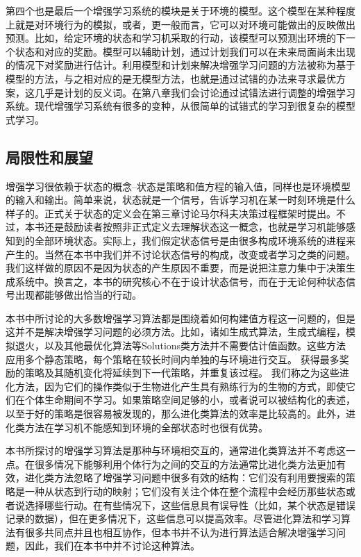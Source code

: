 \documentclass{ctexart}
\begin{document}
            第四个也是最后一个增强学习系统的模块是关于环境的模型。这个模型在某种程度上就是对环境行为的模拟，或者，更一般而言，它可以对环境可能做出的反映做出预测。比如，给定环境的状态和学习机采取的行动，该模型可以预测出环境的下一个状态和对应的奖励。模型可以辅助计划，通过计划我们可以在未来局面尚未出现的情况下对奖励进行估计。利用模型和计划来解决增强学习问题的方法被称为基于模型的方法，与之相对应的是无模型方法，也就是通过试错的办法来寻求最优方案，这几乎是计划的反义词。在第八章我们会讨论通过试错法进行调整的增强学习系统。现代增强学习系统有很多的变种，从很简单的试错式的学习到很复杂的模型式学习。

        \subsection{局限性和展望}
            增强学习很依赖于状态的概念--状态是策略和值方程的输入值，同样也是环境模型的输入和输出。简单来说，状态就是一个信号，告诉学习机在某一时刻环境是什么样子的。正式关于状态的定义会在第三章讨论马尔科夫决策过程框架时提出。不过，本书还是鼓励读者按照非正式定义去理解状态这一概念，也就是学习机能够感知到的全部环境状态。实际上，我们假定状态信号是由很多构成环境系统的进程来产生的。当然在本书中我们并不讨论状态信号的构成，改变或者学习之类的问题。我们这样做的原因不是因为状态的产生原因不重要，而是说把注意力集中于决策生成系统中。换言之，本书的研究核心不在于设计状态信号，而在于无论何种状态信号出现都能够做出恰当的行动。

            本书中所讨论的大多数增强学习算法都是围绕着如何构建值方程这一问题的，但是这并不是解决增强学习问题的必须方法。比如，诸如生成式算法，生成式编程，模拟退火，以及其他最优化算法等Solutions类方法并不需要估计值函数。这些方法应用多个静态策略，每个策略在较长时间内单独的与环境进行交互。 获得最多奖励的策略及其随机变化将延续到下一代策略，并重复该过程。 我们称之为这些进化方法，因为它们的操作类似于生物进化产生具有熟练行为的生物的方式，即使它们在个体生命期间不学习。如果策略空间足够的小，或者说可以被结构化的表述，以至于好的策略是很容易被发现的，那么进化类算法的效率是比较高的。此外，进化类方法在学习机不能感知到环境的全部状态时也很有优势。

            本书所探讨的增强学习算法是那种与环境相交互的，通常进化类算法并不考虑这一点。在很多情况下能够利用个体行为之间的交互的方法通常比进化类方法更加有效，进化类方法忽略了增强学习问题中很多有效的结构：它们没有利用要搜索的策略是一种从状态到行动的映射；它们没有关注个体在整个流程中会经历那些状态或者说选择哪些行动。在有些情况下，这些信息具有误导性（比如，某个状态是错误记录的数据），但在更多情况下，这些信息可以提高效率。尽管进化算法和学习算法有很多共同点并且也相互协作，但本书并不认为进行算法适合解决增强学习问题，因此，我们在本书中并不讨论这种算法。
\end{document}

